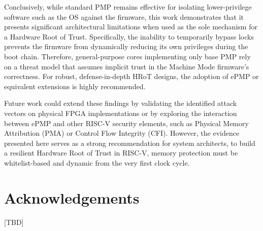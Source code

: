 \documentclass[10pt,a4paper,twocolumn,twoside]{article}
\begin{document}
Conclusively, while standard PMP remains effective for isolating lower-privilege software such as the OS against the firmware, this work demonstrates that it presents significant architectural limitations when used as the sole mechanism for a Hardware Root of Trust. Specifically, the inability to temporarily bypass locks prevents the firmware from dynamically reducing its own privileges during the boot chain. Therefore, general-purpose cores implementing only base PMP rely on a threat model that assumes implicit trust in the Machine Mode firmware's correctness. For robust, defense-in-depth HRoT designs, the adoption of ePMP or equivalent extensions is highly recommended.

Future work could extend these findings by validating the identified attack vectors on physical FPGA implementations or by exploring the interaction between ePMP and other RISC-V security elements, such as Physical Memory Attribution (PMA) or Control Flow Integrity (CFI). However, the evidence presented here serves as a strong recommendation for system architects, to build a resilient Hardware Root of Trust in RISC-V, memory protection must be whitelist-based and dynamic from the very first clock cycle.

\section*{Acknowledgements}
[TBD]
\end{document}
